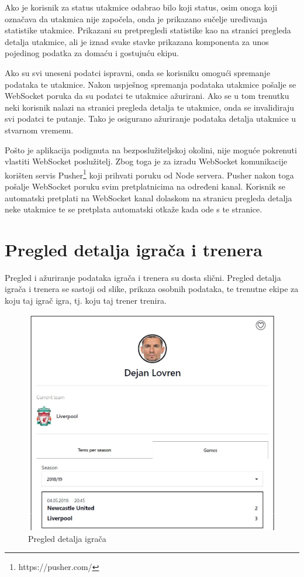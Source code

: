 \documentclass[times, utf8, zavrsni]{fer}
\begin{document}
Ako je korisnik za status utakmice odabrao bilo koji status, osim onoga koji označava da utakmica nije započela, onda je prikazano sučelje uređivanja statistike utakmice.
Prikazani su pretpregledi statistike kao na stranici pregleda detalja utakmice, ali je iznad svake stavke prikazana komponenta za unos pojedinog podatka za domaću i gostujuću ekipu.

Ako su svi uneseni podatci ispravni, onda se korisniku omogući spremanje podataka te utakmice. Nakon uspješnog spremanja podataka utakmice pošalje se WebSocket poruka da su podatci te utakmice ažurirani.
Ako se u tom trenutku neki korisnik nalazi na stranici pregleda detalja te utakmice, onda se invalidiraju svi podatci te putanje. Tako je osigurano ažuriranje podataka detalja utakmice u stvarnom vremenu.

Pošto je aplikacija podignuta na bezposlužiteljskoj okolini, nije moguće pokrenuti vlastiti WebSocket poslužitelj.
Zbog toga je za izradu WebSocket komunikacije korišten servis Pusher\footnote{https://pusher.com/} koji prihvati poruku od Node servera.
Pusher nakon toga pošalje WebSocket poruku svim pretplatnicima na određeni kanal.
Korisnik se automatski pretplati na WebSocket kanal dolaskom na stranicu pregleda detalja neke utakmice te se pretplata automatski otkaže kada ode s te stranice.

\section{Pregled detalja igrača i trenera}

Pregled i ažuriranje podataka igrača i trenera su dosta slični. Pregled detalja igrača i trenera se sastoji od slike, prikaza osobnih podataka, te trenutne ekipe za koju taj igrač igra, tj. koju taj trener trenira.

\begin{figure}[htb]
\centering
\includegraphics[width=12cm]{images/lovren.jpg}
\caption{Pregled detalja igrača}
\label{fig:player}
\end{figure}
\end{document}
